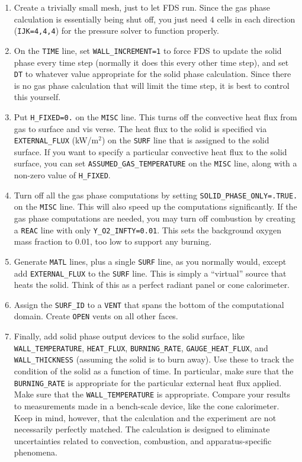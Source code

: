 \documentclass[11pt]{book}
\newcommand{\ct}{\tt\small}
\begin{document}
\begin{enumerate}
\item Create a trivially small mesh, just to let FDS run. Since the
gas phase calculation is essentially being shut off, you just need 4
cells in each direction ({\ct IJK=4,4,4}) for the pressure solver to
function properly.
\item On the {\ct TIME} line, set {\ct WALL\_INCREMENT=1} to force FDS
to update the solid phase every time step (normally it does this every
other time step), and set {\ct DT} to whatever value appropriate for
the solid phase calculation. Since there is no gas phase calculation
that will limit the time step, it is best to control this yourself.
\item Put {\ct H\_FIXED=0.} on the {\ct MISC} line. This turns off the
convective heat flux from gas to surface and vis verse. The heat flux
to the solid is specified via {\ct EXTERNAL\_FLUX} (kW/m$^2$) on the
{\ct SURF} line that is assigned to the solid surface. If you want to specify a particular
convective heat flux to the solid surface, you can set {\ct ASSUMED\_GAS\_TEMPERATURE} on the
{\ct MISC} line, along with a non-zero value of {\ct H\_FIXED}.
\item Turn off all the gas phase computations by setting {\ct SOLID\_PHASE\_ONLY=.TRUE.}
on the {\ct MISC} line. This will also speed
up the computations significantly. If the gas phase computations are
needed, you may turn off combustion by creating a {\ct REAC} line with only
{\ct Y\_O2\_INFTY=0.01}. This sets the background oxygen mass fraction
to 0.01, too low to support any burning.
\item Generate {\ct MATL} lines, plus a single {\ct SURF} line, as you
normally would, except add {\ct EXTERNAL\_FLUX}  to the {\ct SURF}
line. This is simply a ``virtual'' source that heats the solid. Think
of this as a perfect radiant panel or cone calorimeter.
\item Assign the {\ct SURF\_ID} to a {\ct VENT} that spans the bottom
of the computational domain. Create {\ct OPEN} vents on all other
faces.
\item Finally, add solid phase output devices to the solid surface,
like {\ct WALL\_TEMPERATURE}, {\ct HEAT\_FLUX}, {\ct BURNING\_RATE},
{\ct GAUGE\_HEAT\_FLUX}, and {\ct WALL\_THICKNESS} (assuming the solid
is to burn away). Use these to track the condition of the solid as a
function of time. In particular, make sure that the {\ct
BURNING\_RATE} is appropriate for the particular external heat flux
applied. Make sure that the {\ct WALL\_TEMPERATURE} is
appropriate. Compare your results to measurements made in a
bench-scale device, like the cone calorimeter. Keep in mind, however,
that the calculation and the experiment are not necessarily perfectly
matched. The calculation is designed to eliminate uncertainties
related to convection, combustion, and apparatus-specific phenomena.
\end{enumerate}
\end{document}
